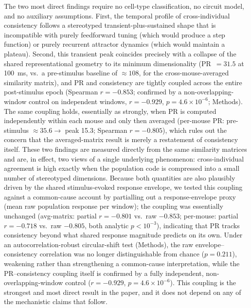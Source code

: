 \documentclass[11pt,onecolumn]{article}
\begin{document}
The two most direct findings require no cell-type classification, no
circuit model, and no auxiliary assumptions.  First, the temporal profile
of cross-individual consistency follows a stereotyped
transient-plus-sustained shape that is incompatible with purely feedforward
tuning (which would produce a step function) or purely recurrent attractor
dynamics (which would maintain a plateau).  Second, this transient peak
coincides precisely with a collapse of the shared representational geometry
to its minimum dimensionality (PR~$= 31.5$ at 100~ms, vs.\ a pre-stimulus
baseline of $\approx 108$, for the cross-mouse-averaged similarity
matrix), and PR and consistency are tightly coupled across the entire
post-stimulus epoch (Spearman $r = -0.853$; confirmed by a
non-overlapping-window control on independent windows, $r = -0.929$,
$p = 4.6\times10^{-6}$; Methods).  The same coupling holds,
essentially as strongly, when PR is computed independently within each
mouse and only then averaged (per-mouse PR: pre-stimulus $\approx 35.6 \to$
peak 15.3; Spearman $r = -0.805$), which rules out the concern that the
averaged-matrix result is merely a restatement of consistency itself.
These two
findings are measured directly from the same similarity matrices and are,
in effect, two views of a single underlying phenomenon: cross-individual
agreement is high exactly when the population code is compressed into a
small number of stereotyped dimensions.  Because both quantities are also
plausibly driven by the shared stimulus-evoked response envelope, we
tested this coupling against a common-cause account by partialling out a
response-envelope proxy (mean raw population response per window); the
coupling was essentially unchanged (avg-matrix: partial
$r = -0.801$ vs.\ raw $-0.853$; per-mouse: partial $r = -0.718$ vs.\ raw
$-0.805$, both analytic $p < 10^{-3}$), indicating that PR tracks
consistency beyond what shared response magnitude predicts on its own.
Under an autocorrelation-robust circular-shift test (Methods), the raw
envelope--consistency correlation was no longer distinguishable from
chance ($p = 0.211$), weakening rather than strengthening a common-cause
interpretation, while the PR--consistency coupling itself is confirmed
by a fully independent, non-overlapping-window control ($r = -0.929$,
$p = 4.6\times10^{-6}$).  This coupling
is the strongest and most direct result in the paper, and it does not
depend on any of the mechanistic claims that follow.
\end{document}
